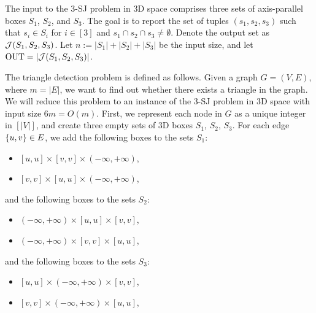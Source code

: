 The input to the 3-SJ problem in 3D space comprises
 three sets of axis-parallel boxes $S_1$, $S_2$, and $S_3$. 
The goal is to report the set of tuples $(s_1,s_2,s_3)$ such that $s_i \in S_i$ for $i \in [3]$ and $s_1 \cap s_2 \cap s_3 \neq \emptyset$. Denote the output set as $\mathcal{J}(S_1,S_2,S_3)$.
Let $n:=|S_1|+|S_2|+|S_3|$ be the input size, and let $\mathrm{OUT} = |\mathcal{J}(S_1,S_2,S_3)|$.

The triangle detection problem is defined as follows. Given a graph $G = (V,E)$, where $m=|E|$, we want to find out whether there exists a triangle in the graph. We will reduce this problem to an instance of the 3-SJ problem in 3D space with input size $6m=O(m)$. First, we represent each node in $G$ as a unique integer in $[|V|]$, and create three empty sets of 3D boxes $S_1$, $S_2$, $S_3$. For each edge $\{u,v\}\in E$, we add the following boxes to the sets $S_1$:
\begin{itemize}
    \item $[u,u]\times [v,v]\times(-\infty,+\infty)$,
    \item $[v,v]\times [u,u] \times (-\infty,+\infty)$,
\end{itemize}
and the following boxes to the sets $S_2$:
\begin{itemize}
    \item $(-\infty,+\infty)\times[u,u]\times [v,v]$,
    \item $(-\infty,+\infty) \times[v,v]\times [u,u]$,
\end{itemize}
and the following boxes to the sets $S_3$:
\begin{itemize}
    \item $[u,u]\times(-\infty,+\infty)\times [v,v]$,
    \item $[v,v]\times(-\infty,+\infty)\times [u,u]$,
\end{itemize}


